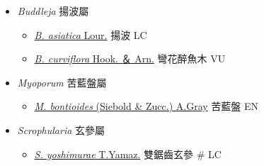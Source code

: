 
  \begin{itemize}
 \item[] \textit{Buddleja} 揚波屬
                                
  \begin{itemize}
        \item[] \href{http://www.theplantlist.org/tpl1.1/search?q=Buddleja+asiatica}{\textit{B. asiatica} Lour.}   揚波   LC
        \item[] \href{http://www.theplantlist.org/tpl1.1/search?q=Buddleja+curviflora}{\textit{B. curviflora} Hook. ＆ Arn.}   彎花醉魚木   VU
  \end{itemize}
 \item[] \textit{Myoporum} 苦藍盤屬
                                
  \begin{itemize}
        \item[] \href{http://www.theplantlist.org/tpl1.1/search?q=Myoporum+bontioides}{\textit{M. bontioides} (Siebold \& Zucc.) A.Gray}   苦藍盤   EN
  \end{itemize}
 \item[] \textit{Scrophularia} 玄參屬
                                
  \begin{itemize}
        \item[] \href{http://www.theplantlist.org/tpl1.1/search?q=Scrophularia+yoshimurae}{\textit{S. yoshimurae} T.Yamaz.}   雙鋸齒玄參  \# LC
  \end{itemize}
  \end{itemize}
